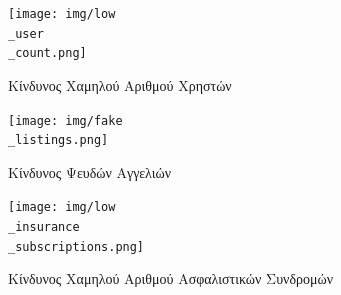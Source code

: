 \documentclass{../ol-softwaremanual}
\begin{document}
	\newpage

\begin{figure}[htbp!]
	\texttt{[image: img/low\\\_user\\\_count.png]}
	\caption{Kίνδυνος Χαμηλού Αριθμού Χρηστών}
\end{figure}
	
	\newpage
	\begin{figure}[htbp!]
		\texttt{[image: img/fake\\\_listings.png]}
		\caption{Kίνδυνος Ψευδών Αγγελιών}
	\end{figure}
	
	\newpage
	
	\begin{figure}[htbp!]
			\texttt{[image: img/low\\\_insurance\\\_subscriptions.png]}
		\caption{Kίνδυνος Χαμηλού Αριθμού Ασφαλιστικών Συνδρομών}
	\end{figure}
	
\end{document}
